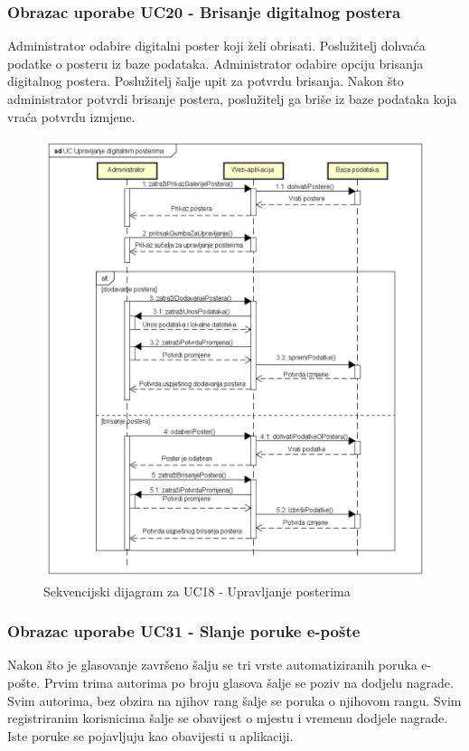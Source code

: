 				\subsubsection{Obrazac uporabe UC20 - Brisanje digitalnog postera}
				Administrator odabire digitalni poster koji želi obrisati. Poslužitelj dohvaća podatke o posteru iz baze podataka. Administrator odabire opciju brisanja digitalnog postera. Poslužitelj šalje upit za potvrdu brisanja. Nakon što administrator potvrdi brisanje postera, poslužitelj ga briše iz baze podataka koja vraća potvrdu izmjene.
				
				\newpage
				
				\begin{figure}[hp!]
					\includegraphics[width=\linewidth]{Slike/SD_UpravljanjePosterima.png}
					\caption{Sekvencijski dijagram za UC18 - Upravljanje posterima}
				\end{figure}
				
				\newpage
				
				\subsubsection{Obrazac uporabe UC31 - Slanje poruke e-pošte}
				Nakon što je glasovanje završeno šalju se tri vrste automatiziranih poruka e-pošte. Prvim trima autorima po broju glasova šalje se poziv na dodjelu nagrade. Svim autorima, bez obzira na njihov rang šalje se poruka o njihovom rangu. Svim registriranim korisnicima šalje se obavijest o mjestu i vremenu dodjele nagrade. Iste poruke se pojavljuju kao obavijesti u aplikaciji.
				
